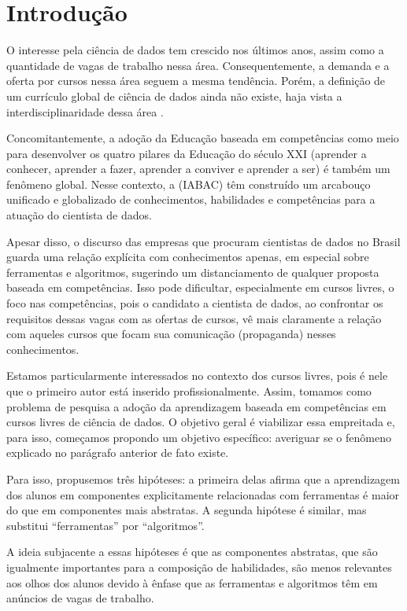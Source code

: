 \section{Introdução}
O interesse pela ciência de dados tem crescido nos últimos anos, assim como a quantidade de vagas de trabalho nessa área.
Consequentemente, a demanda e a oferta por cursos nessa área seguem a mesma tendência.
Porém, a definição de um currículo global de ciência de dados ainda não existe, haja vista a interdisciplinaridade dessa área \cite{VanderPlas2016}.

Concomitantemente, a adoção da Educação baseada em competências como meio para desenvolver os quatro pilares da Educação do século XXI (aprender a conhecer, aprender a fazer, aprender a conviver e aprender a ser) é também um fenômeno global.
Nesse contexto, a  (IABAC) têm construído um arcabouço unificado e globalizado de conhecimentos, habilidades e competências para a atuação do cientista de dados.

Apesar disso, o discurso das empresas que procuram cientistas de dados no Brasil guarda uma relação explícita com conhecimentos apenas, em especial sobre ferramentas e algoritmos, sugerindo um distanciamento de qualquer proposta baseada em competências.
Isso pode dificultar, especialmente em cursos livres, o foco nas competências, pois o candidato a cientista de dados, ao confrontar os requisitos dessas vagas com as ofertas de cursos, vê mais claramente a relação com aqueles cursos que focam sua comunicação (propaganda) nesses conhecimentos.

Estamos particularmente interessados no contexto dos cursos livres, pois é nele que o primeiro autor está inserido profissionalmente.
Assim, tomamos como problema de pesquisa a adoção da aprendizagem baseada em competências em cursos livres de ciência de dados.
O objetivo geral é viabilizar essa empreitada e, para isso, começamos propondo um objetivo específico: averiguar se o fenômeno explicado no parágrafo anterior de fato existe.

Para isso, propusemos três hipóteses: a primeira delas afirma que a aprendizagem dos alunos em componentes explicitamente relacionadas com ferramentas é maior do que em componentes mais abstratas.
A segunda hipótese é similar, mas substitui ``ferramentas'' por ``algoritmos''.

A ideia subjacente a essas hipóteses é que as componentes abstratas, que são igualmente importantes para a composição de habilidades, são menos relevantes aos olhos dos alunos devido à ênfase que as ferramentas e algoritmos têm em anúncios de vagas de trabalho.


